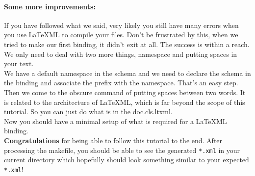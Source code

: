 \documentclass{article}
\begin{document}
\paragraph{Some more improvements:} If you have followed what we said, very likely you still have many errors when you use \LaTeX ML to compile your files. Don't be frustrated by this, when we tried to make our first binding, it didn't exit at all. The success is within a reach. We only need to deal with two more things, namespace and putting spaces in your text.\\

\noindent We have a default namespace in the schema and we need to declare the schema in the binding and associate the prefix with the namespace. That's an easy step. Then we come to the obscure command of putting spaces between two words. It is related to the architecture of \LaTeX ML, which is far beyond the scope of this tutorial. So you can just do what is in the doc.cls.ltxml.\\
 
Now you should have a minimal setup of what is required for a \LaTeX ML binding. \\ 

\noindent\textbf{Congratulations} for being able to follow this tutorial to the end. After processing the makefile, you should be able to see the generated \texttt{*.xml} in your current directory which hopefully should look something similar to your expected \texttt{*.xml}! \\
\end{document}
